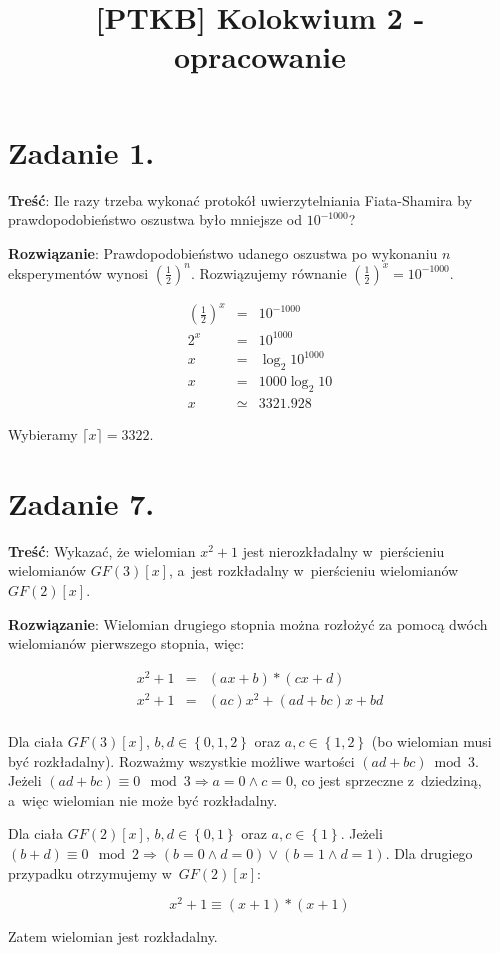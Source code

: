 \documentclass[a4paper,10pt, twocolumn]{article}
\title{[PTKB] Kolokwium 2 - opracowanie}
\author{}
\date{}
\begin{document}
\maketitle

\section{Zadanie 1.}

\textbf{Treść}: Ile razy trzeba wykonać protokół uwierzytelniania Fiata-Shamira by prawdopodobieństwo oszustwa było mniejsze od $10^{-1000}$?

\textbf{Rozwiązanie}: Prawdopodobieństwo udanego oszustwa po wykonaniu $n$ eksperymentów wynosi $(\frac{1}{2})^{n}$. Rozwiązujemy równanie $(\frac{1}{2})^{x} = 10^{-1000}$.

\begin{equation}
	\begin{array}{lcl} (\frac{1}{2})^{x} & = & 10^{-1000} \\ 2^{x} & = & 10^{1000} \\ x & = & \log_{2} 10^{1000} \\ x & = & 1000 \log_{2} 10 \\ x & \simeq & 3321.928 \end{array}
\end{equation}

Wybieramy $\lceil x \rceil = 3322$.

\section{Zadanie 7.}

\textbf{Treść}: Wykazać, że wielomian $x^{2} + 1$ jest nierozkładalny w~pierścieniu wielomianów $GF(3)[x]$, a~jest rozkładalny w~pierścieniu wielomianów $GF(2)[x]$.

\textbf{Rozwiązanie}: Wielomian drugiego stopnia można rozłożyć za pomocą dwóch wielomianów pierwszego stopnia, więc:

\begin{equation}
	\begin{array}{lcl} x^{2} + 1 & = & (ax + b) * (cx + d) \\ x^{2} + 1 & = & (ac)x^{2} + (ad + bc)x + bd \\ \end{array}
\end{equation}

Dla ciała $GF(3)[x]$, $b, d \in \left\{0, 1, 2\right\}$ oraz $a, c \in \left\{1, 2\right\}$ (bo wielomian musi być rozkładalny). Rozważmy wszystkie możliwe wartości $(ad + bc) \bmod{3}$. Jeżeli $(ad + bc) \equiv 0 \mod 3 \Rightarrow a = 0 \wedge c = 0$, co jest sprzeczne z~dziedziną, a~więc wielomian nie może być rozkładalny.

Dla ciała $GF(2)[x]$, $b, d \in \left\{0, 1\right\}$ oraz $a, c \in \left\{1\right\}$. Jeżeli $(b + d) \equiv 0 \mod 2 \Rightarrow (b = 0 \wedge d = 0) \vee (b = 1 \wedge d = 1)$. Dla drugiego przypadku otrzymujemy w~$GF(2)[x]$:

\begin{equation}
	x^{2} + 1 \equiv (x+1) * (x+1)
\end{equation}

Zatem wielomian jest rozkładalny.
\end{document}

